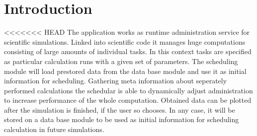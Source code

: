 \section{Introduction}






<<<<<<< HEAD
The application works as runtime administration service for scientific simulations. Linked into scientific code it manages huge computations consisting of large amounts of individual tasks. In this context tasks are specified as particular calculation runs with a given set of parameters. The scheduling module will load prestored data from the data base module and use it as initial information for scheduling. Gathering meta information about seperately performed calculations the schedular is able to dynamically adjust administration to increase performance of the whole computation. Obtained data can be plotted after the simulation is finished, if the user so chooses. In any case, it will be stored on a data base module to be used as initial information for scheduling calculation in future simulations.


